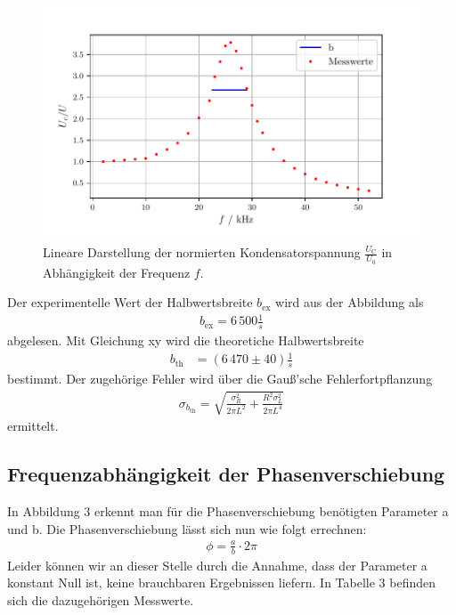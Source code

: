 \begin{figure}[H]
  \centering
  \includegraphics{plotc.pdf}
  \caption{Lineare Darstellung der normierten Kondensatorspannung $\frac{U_\text{C}}{U_\text{0}}$ in Abhängigkeit der Frequenz $f$.}
  \label{fig:Plot c}
\end{figure}

Der experimentelle Wert der Halbwertsbreite $b_\text{ex}$ wird aus der Abbildung als
\begin{align*}
b_\text{ex} = 6\,500\frac{1}{s}
\end{align*}
abgelesen. Mit Gleichung xy wird die theoretiche Halbwertsbreite 
\begin{align*}
b_\text{th} &= (6\,470 \pm 40)\frac{1}{s}
\end{align*}
bestimmt. Der zugehörige Fehler wird über die Gauß'sche Fehlerfortpflanzung 
\begin{align*}
\sigma_{b_\text{th}} = \sqrt{\frac{\sigma_{R}^{2}}{2 \pi L^{2}} + \frac{R^{2} \sigma_{L}^{2}}{2 \pi L^{4}}}
\end{align*}
ermittelt.
\subsection{ Frequenzabhängigkeit der Phasenverschiebung}
In Abbildung 3 erkennt man für die Phasenverschiebung benötigten Parameter a und b. Die Phasenverschiebung lässt sich nun wie folgt errechnen:
\begin{align*}
\phi = \frac{a}{b} \cdot 2\pi
\end{align*}
Leider können wir an dieser Stelle durch die Annahme, dass der Parameter a konstant Null ist, keine brauchbaren Ergebnissen liefern. In Tabelle 3
befinden sich die dazugehörigen Messwerte.

